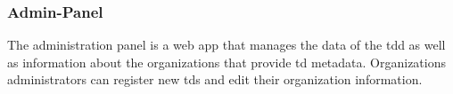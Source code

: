 \subsubsection{Admin-Panel}\label{sec:adminpanel}

The administration panel is a web app that manages the data of the \gls{tdd} as well as information about the organizations that provide \gls{td} metadata. Organizations administrators can register new \glspl{td} and edit their organization information.
